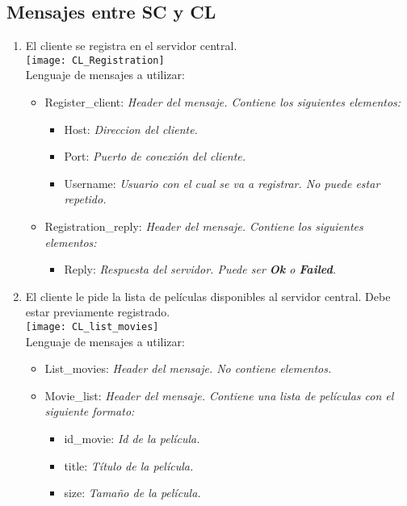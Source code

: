 \documentclass{article}
\begin{document}
\subsection*{Mensajes entre SC y CL}
\begin{enumerate}
    \item El cliente se registra en el servidor central.\\[0.4cm]
    \texttt{[image: CL\_Registration]}\\[0.4cm]
    Lenguaje de mensajes a utilizar:
    \begin{itemize}
        \item Register\_client:    \emph{Header del mensaje. Contiene los siguientes elementos:}
        \begin{itemize}
            \item Host:    \emph{Direccion del cliente.}
            \item Port:    \emph{Puerto de conexión del cliente.}
            \item Username:    \emph{Usuario con el cual se va a registrar. No puede estar repetido.}
        \end{itemize}
        \item Registration\_reply:    \emph{Header del mensaje. Contiene los siguientes elementos:}
        \begin{itemize}
            \item Reply:    \emph{Respuesta del servidor. Puede ser \textbf{Ok} o \textbf{Failed}.}
        \end{itemize}
    \end{itemize}

    \item El cliente le pide la lista de películas disponibles al servidor central. Debe estar previamente registrado.\\[0.4cm]
    \texttt{[image: CL\_list\_movies]}\\[0.4cm]
    Lenguaje de mensajes a utilizar:
    \begin{itemize}
        \item List\_movies:    \emph{Header del mensaje. No contiene elementos.}
        \item Movie\_list:    \emph{Header del mensaje. Contiene una lista de películas con el siguiente formato:}
        \begin{itemize}
            \item id\_movie:    \emph{Id de la película.}
            \item title:    \emph{Título de la película.}
            \item size:    \emph{Tamaño de la película.}
        \end{itemize}
    \end{itemize}
\end{enumerate}
\end{document}
